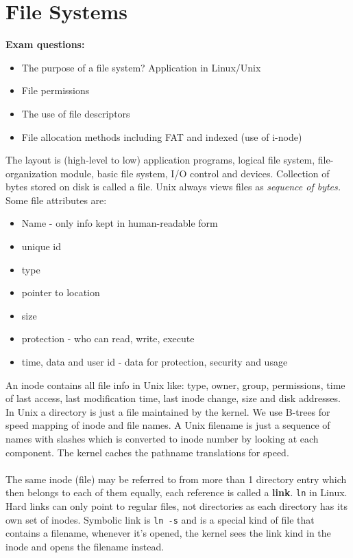 \documentclass[twoside]{article}
\begin{document}
\section{File Systems}
\textbf{Exam questions:}
\begin{itemize}
\item The purpose of a file system? Application in Linux/Unix
\item File permissions
\item The use of file descriptors
\item File allocation methods including FAT and indexed (use of i-node)
\end{itemize}
The layout is (high-level to low) application programs, logical file system, file-organization module, basic file system, I/O control and devices. Collection of bytes stored on disk is called a file. Unix always views files as \emph{sequence of bytes.} Some file attributes are:
\begin{itemize}
\item Name - only info kept in human-readable form
\item unique id
\item type
\item pointer to location
\item size
\item protection - who can read, write, execute
\item time, data and user id - data for protection, security and usage
\end{itemize}
An inode contains all file info in Unix like: type, owner, group, permissions, time of last access, last modification time, last inode change, size and disk addresses. In Unix a directory is just a file maintained by the kernel. We use B-trees for speed mapping of inode and file names. A Unix filename is just a sequence of names with slashes which is converted to inode number by looking at each component. The kernel caches the pathname translations for speed.\\ \\
The same inode (file) may be referred to from more than 1 directory entry which then belongs to each of them equally, each reference is called a \textbf{link}. \texttt{ln} in Linux. Hard links can only point to regular files, not directories as each directory has its own set of inodes. Symbolic link is \texttt{ln -s} and is a special kind of file that contains a filename, whenever it's opened, the kernel sees the link kind in the inode and opens the filename instead.
\end{document}
